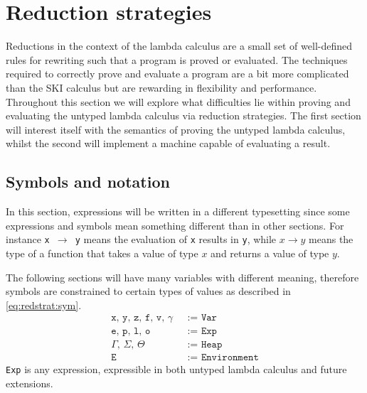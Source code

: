 \section{Reduction strategies}
\label{sec:redstrat}
Reductions in the context of the lambda calculus are a small set of well-defined rules for rewriting such that a program is proved or evaluated.
The techniques required to correctly prove and evaluate a program are a bit more complicated than the SKI calculus but are rewarding in flexibility and performance.
Throughout this section we will explore what difficulties lie within proving and evaluating the untyped lambda calculus via reduction strategies.
The first section will interest itself with the semantics of proving the untyped lambda calculus, whilst the second will implement a machine capable of evaluating a result.

\subsection{Symbols and notation}
In this section, expressions will be written in a different typesetting since some expressions and symbols mean something different than in other sections.
For instance \texttt{x $\rightarrow$ y} means the evaluation of \texttt{x} results in \texttt{y}, while $x \rightarrow y$ means the type of a function that takes a value of type $x$ and returns a value of type $y$.

The following sections will have many variables with different meaning, therefore symbols are constrained to certain types of values as described in \autoref{eq:redstrat:sym}.
\begin{align}
	\texttt{x, y, z, f, v, $\gamma$ }      & \texttt{:= Var}\label{eq:redstrat:sym} \\
	\texttt{e, p, l, o }                   & \texttt{:= Exp}\tag*{}                 \\
	\texttt{$\Gamma$, $\Sigma$, $\Theta$ } & \texttt{:= Heap}\tag*{}                \\
	\texttt{E }                            & \texttt{:= Environment}\tag*{}
\end{align}
\texttt{Exp} is any expression, expressible in both untyped lambda calculus and future extensions.


